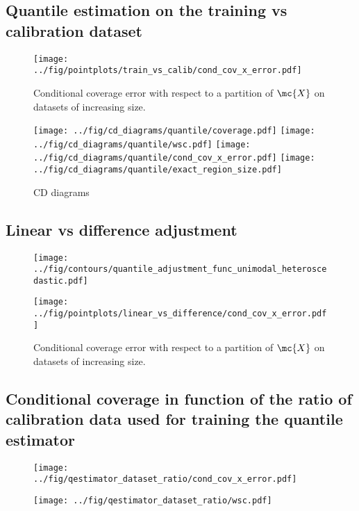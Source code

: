 \subsection{Quantile estimation on the training vs calibration dataset}

\begin{figure}[H]
    \centering
    \texttt{[image: ../fig/pointplots/train\_vs\_calib/cond\_cov\_x\_error.pdf]}
    \caption{Conditional coverage error with respect to a partition of $\mc{X}$ on datasets of increasing size.}
\end{figure}

\begin{figure}[H]
    \centering
    \texttt{[image: ../fig/cd\_diagrams/quantile/coverage.pdf]}
    \texttt{[image: ../fig/cd\_diagrams/quantile/wsc.pdf]}
    \texttt{[image: ../fig/cd\_diagrams/quantile/cond\_cov\_x\_error.pdf]}
    \texttt{[image: ../fig/cd\_diagrams/quantile/exact\_region\_size.pdf]}
    \caption{CD diagrams}
\end{figure}

\subsection{Linear vs difference adjustment}

\begin{figure}[H]
    \centering
    \texttt{[image: ../fig/contours/quantile\_adjustment\_func\_unimodal\_heteroscedastic.pdf]}
    \caption{}
\end{figure}

\begin{figure}[H]
    \centering
    \texttt{[image: ../fig/pointplots/linear\_vs\_difference/cond\_cov\_x\_error.pdf]}
    \caption{Conditional coverage error with respect to a partition of $\mc{X}$ on datasets of increasing size.}
\end{figure}

\subsection{Conditional coverage in function of the ratio of calibration data used for training the quantile estimator}

\begin{figure}[H]
    \centering
    \texttt{[image: ../fig/qestimator\_dataset\_ratio/cond\_cov\_x\_error.pdf]}
    \caption{}
\end{figure}

\begin{figure}[H]
    \centering
    \texttt{[image: ../fig/qestimator\_dataset\_ratio/wsc.pdf]}
    \caption{}
\end{figure}
